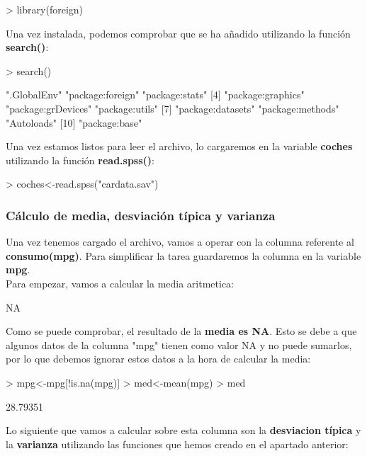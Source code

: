 \documentclass [a4paper] {article}
\begin{document}
\begin{Schunk}
\begin{Sinput}
> library(foreign)
\end{Sinput}
\end{Schunk}
Una vez instalada, podemos comprobar que se ha añadido utilizando la función \textbf{search()}:

\begin{Schunk}
\begin{Sinput}
> search()
\end{Sinput}
\begin{Soutput}
 [1] ".GlobalEnv"        "package:foreign"   "package:stats"    
 [4] "package:graphics"  "package:grDevices" "package:utils"    
 [7] "package:datasets"  "package:methods"   "Autoloads"        
[10] "package:base"     
\end{Soutput}
\end{Schunk}
Una vez estamos listos para leer el archivo, lo cargaremos en la variable \textbf{coches} utilizando
la función \textbf{read.spss()}:

\begin{Schunk}
\begin{Sinput}
> coches<-read.spss("cardata.sav")
\end{Sinput}
\end{Schunk}

\subsubsection{Cálculo de media, desviación típica y varianza}
Una vez tenemos cargado el archivo, vamos a operar con la columna referente al \textbf{consumo(mpg)}.
Para simplificar la tarea guardaremos la columna en la variable \textbf{mpg}.\\
Para empezar, vamos a calcular la media aritmetica:

\begin{Schunk}
\begin{Soutput}
[1] NA
\end{Soutput}
\end{Schunk}
Como se puede comprobar, el resultado de la \textbf{media es NA}. Esto se debe a que algunos datos de 
la columna "mpg" tienen como valor NA y no puede sumarlos, por lo que debemos ignorar estos datos
a la hora de calcular la media:

\begin{Schunk}
\begin{Sinput}
> mpg<-mpg[!is.na(mpg)]
> med<-mean(mpg)
> med
\end{Sinput}
\begin{Soutput}
[1] 28.79351
\end{Soutput}
\end{Schunk}
Lo siguiente que vamos a calcular sobre esta columna son la \textbf{desviacion típica} y
la \textbf{varianza} utilizando las funciones que hemos creado en el apartado anterior:
 
\end{document}
